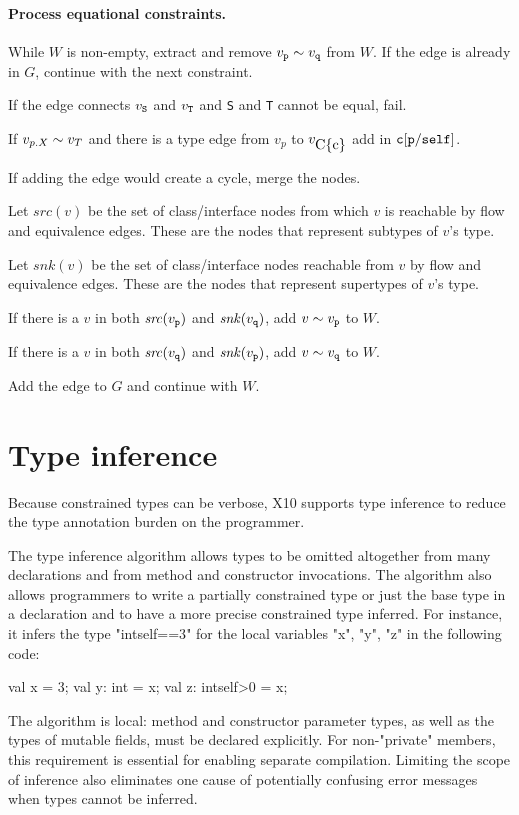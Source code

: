 \documentclass[preprint,nocopyrightspace,9pt]{sigplanconf}
\begin{document}
\paragraph{Process equational constraints.}
While $W$ is non-empty, extract and remove  $v_{\tt p} \eqedge v_{\tt q}$
from $W$.
If the edge is already in $G$, continue with the next constraint.

If the edge connects $v_{\tt S}$ and $v_{\tt T}$
and {\tt S} and {\tt T} cannot be equal, fail.

If $v_{p.X} \eqedge v_T$
and there is a type edge from $v_p$ to $v_{\Xcd{C\{c\}}}$
add in ${\tt c[p/self]}$.

If adding the edge would create a cycle, merge the nodes.

Let $\mathit{src}(v)$ be the set of class/interface nodes from which
$v$ is reachable by flow and equivalence edges.
These are the nodes that represent subtypes of $v$'s type.

Let $\mathit{snk}(v)$ be the set of class/interface nodes reachable from
$v$ by flow and equivalence edges.
These are the nodes that represent supertypes of $v$'s type.

If there is a $v$ in both $\mathit{src}(v_{\tt p})$
              and $\mathit{snk}(v_{\tt q})$,
add $v \eqedge v_{\tt p}$
to $W$.

If there is a $v$ in both $\mathit{src}(v_{\tt q})$
              and $\mathit{snk}(v_{\tt p})$,
add $v \eqedge v_{\tt q}$
to $W$.

Add the edge to $G$ and continue with $W$.




\section{Type inference}

Because constrained types can be verbose, X10 supports type
inference to reduce the type annotation burden on the
programmer.

The type inference algorithm allows types to be omitted
altogether from many declarations and from method
and constructor invocations.
The algorithm also allows programmers to write a
partially constrained type or just the base type in a
declaration and to have a more precise constrained type
inferred.
For instance, it infers the type \xcd"int{self==3}" for the
local variables \xcd"x", \xcd"y", \xcd"z" in the following code:
\begin{xten}
val x = 3;
val y: int = x;
val z: int{self>0} = x;
\end{xten}
The algorithm is local: method and constructor parameter types,
as well as the types of mutable fields,
must be declared explicitly.  For non-\xcd"private" members,
this requirement is essential for enabling separate compilation.
Limiting the scope of inference also eliminates one cause of
potentially confusing error messages when types cannot be inferred.
\end{document}
